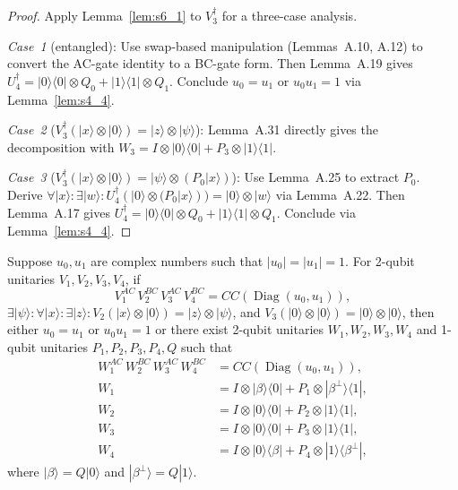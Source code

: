 \begin{proof}
  \leanok
  Apply Lemma~\ref{lem:s6_1} to $V_3^\dagger$ for a three-case analysis.

  \emph{Case~1} (entangled):
  Use swap-based manipulation (Lemmas~A.10, A.12) to convert the AC-gate
  identity to a BC-gate form.
  Then Lemma~A.19 gives
  $U_4^\dagger = |0\rangle\langle 0| \otimes Q_0 + |1\rangle\langle 1| \otimes Q_1$.
  Conclude $u_0 = u_1$ or $u_0 u_1 = 1$ via Lemma~\ref{lem:s4_4}.

  \emph{Case~2} ($V_3^\dagger(|x\rangle \otimes |0\rangle) = |z\rangle \otimes |\psi\rangle$):
  Lemma~A.31 directly gives the decomposition with
  $W_3 = I \otimes |0\rangle\langle 0| + P_3 \otimes |1\rangle\langle 1|$.

  \emph{Case~3} ($V_3^\dagger(|x\rangle \otimes |0\rangle) = |\psi\rangle \otimes (P_0 |x\rangle)$):
  Use Lemma~A.25 to extract $P_0$.
  Derive $\forall |x\rangle : \exists |w\rangle :
  U_4^\dagger(|0\rangle \otimes (P_0 |x\rangle)) = |0\rangle \otimes |w\rangle$
  via Lemma~A.22.
  Then Lemma~A.17 gives
  $U_4^\dagger = |0\rangle\langle 0| \otimes Q_0 + |1\rangle\langle 1| \otimes Q_1$.
  Conclude via Lemma~\ref{lem:s4_4}.
\end{proof}

\begin{lemma}
  \label{lem:s6_3}
  \leanok
  Suppose $u_0, u_1$ are complex numbers such that $|u_0| = |u_1| = 1$.
  For 2-qubit unitaries $V_1, V_2, V_3, V_4$, if
  \[
    V_1^{AC}\, V_2^{BC}\, V_3^{AC}\, V_4^{BC} = CC(\operatorname{Diag}(u_0, u_1)),
  \]
  $\exists |\psi\rangle : \forall |x\rangle : \exists |z\rangle :
    V_2(|x\rangle \otimes |0\rangle) = |z\rangle \otimes |\psi\rangle$,
  and $V_3(|0\rangle \otimes |0\rangle) = |0\rangle \otimes |0\rangle$,
  then either $u_0 = u_1$ or $u_0 u_1 = 1$ or there exist 2-qubit unitaries
  $W_1, W_2, W_3, W_4$ and 1-qubit unitaries $P_1, P_2, P_3, P_4, Q$ such that
  \begin{align*}
    W_1^{AC}\, W_2^{BC}\, W_3^{AC}\, W_4^{BC} &= CC(\operatorname{Diag}(u_0, u_1)), \\
    W_1 &= I \otimes |\beta\rangle\langle 0| + P_1 \otimes |\beta^\perp\rangle\langle 1|, \\
    W_2 &= I \otimes |0\rangle\langle 0| + P_2 \otimes |1\rangle\langle 1|, \\
    W_3 &= I \otimes |0\rangle\langle 0| + P_3 \otimes |1\rangle\langle 1|, \\
    W_4 &= I \otimes |0\rangle\langle\beta| + P_4 \otimes |1\rangle\langle\beta^\perp|,
  \end{align*}
  where $|\beta\rangle = Q|0\rangle$ and $|\beta^\perp\rangle = Q|1\rangle$.
\end{lemma}

